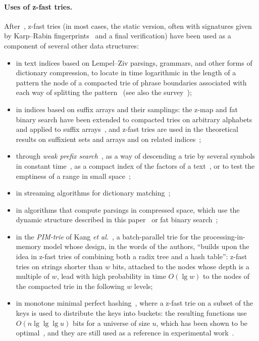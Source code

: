 \documentclass[a4paper]{article}
\newcommand{\?}{\mskip1.5mu}
\begin{document}
\paragraph{Uses of z-fast tries.} After~\cite{BBPMMPH,Belazzougui2010Fast,BBVDZT}, z-fast tries (in most cases, the static 
version, often with signatures given by Karp--Rabin fingerprints~\cite{Karp1987Efficient} and a final verification) have been used as a component of several other data structures: 
\begin{itemize}
\item in text indices based on Lempel--Ziv parsings, grammars, and other forms of dictionary compression, to locate 
in time logarithmic in the length of a pattern the node of a compacted trie of phrase boundaries associated with each way of splitting the 
pattern~\cite{Gagie2014LZ77,Bille2018Time,Christiansen2018Compressed,Navarro2019Universal,Christiansen2021Optimal,Tsuruta2020Grammar,Gagie2024Space,Kosolobov2026Compressed} (see 
also the survey~\cite{Navarro2021Indexing});
\item in indices based on suffix arrays and their samplings: the z-map and fat binary search have been 
extended to compacted tries on arbitrary alphabets and applied to suffix 
arrays~\cite{BoVKNDLSM,BMVEZA}, and z-fast tries are used in the theoretical results on suffixient sets and arrays and on related indices~\cite{Depuydt2023Suffixient,Cenzato2026Suffixient,Becker2026Compressing};
\item through \emph{weak prefix search}~\cite{Belazzougui2010Fast}, as a way of descending a trie by several symbols in constant 
time~\cite{Navarro2017Time,Gagie2020Fully}, as a compact index of the factors of a text~\cite{Belazzougui2015Improved}, or to test 
the emptiness of a range in small space~\cite{Belazzougui2021Range,Goswami2015Approximate};
\item in streaming algorithms for dictionary matching~\cite{Clifford2015Dictionary,Gawrychowski2022Streaming};
\item in algorithms that compute parsings in compressed space, which use the dynamic structure described in this paper~\cite{Badkobeh2017Two} or fat binary search~\cite{Kempa2017LZ};
\item in the \emph{PIM-trie} of Kang \textit{et al.}~\cite{Kang2023PIM}, a batch-parallel trie for the processing-in-memory model 
whose design, in the words of the authors, ``builds upon the idea in z-fast tries of combining both a radix tree and a hash table'': 
z-fast tries on strings shorter than $w$ bits, attached to the nodes whose depth is a multiple of $w$, lead with high probability in 
time $O(\lg w)$ to the nodes of the compacted trie in the following $w$ levels;
\item in monotone minimal perfect hashing~\cite{BBPMMPH,Belazzougui2011Theory}, where a z-fast trie on a subset of the keys is used to distribute the keys into buckets: 
the resulting functions use $O(n\lg\lg\lg u)$ bits for a universe of size $u$, which has been shown to be optimal~\cite{Assadi2023Tight,Kosolobov2024Simplified}, 
and they are still used as a reference in experimental work~\cite{Ferragina2023Learned}.
\end{itemize}
\end{document}
